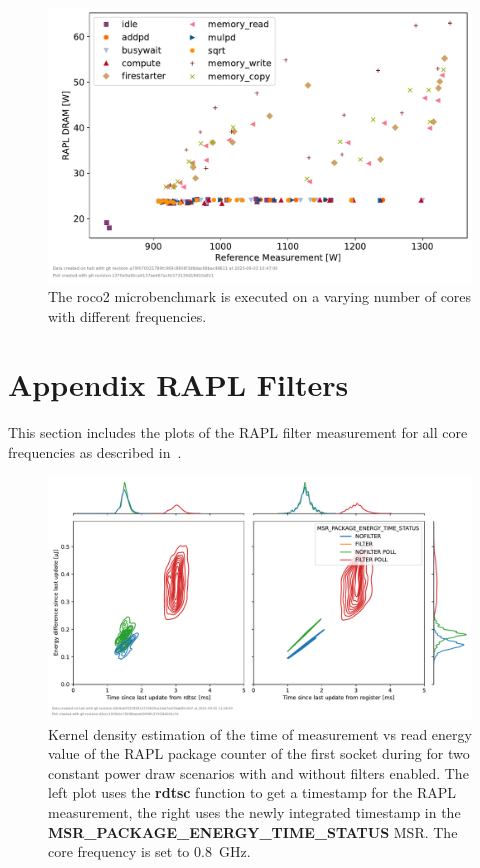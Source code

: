 \begin{figure}[]
    \centering
    \includegraphics[width=0.8\columnwidth]{fig/rapl-accuracy/rapl-accuracy-dram.pdf}
    \caption{The roco2 microbenchmark is executed on a varying number of cores with different frequencies.}
\end{figure}

\chapter{Appendix RAPL Filters}
\label{app:rapl_filters}
This section includes the plots of the RAPL filter measurement for all core frequencies as described in~.

\clearpage

\begin{figure}[]
    \centering
    \includegraphics[width=\columnwidth]{fig/rapl-update-intervals/MSR_PACKAGE_ENERGY_TIME_STATUS_800000.pdf}
    \caption{Kernel density estimation of the time of measurement vs read energy value of the RAPL package counter of the first socket during for two constant power draw scenarios with and without filters enabled.
    The left plot uses the \textbf{rdtsc} function to get a timestamp for the RAPL measurement, the right uses the newly integrated timestamp in the \textbf{MSR\_PACKAGE\_ENERGY\_TIME\_STATUS} MSR.
    The core frequency is set to \SI{0.8}{\GHz}.}
\end{figure}

